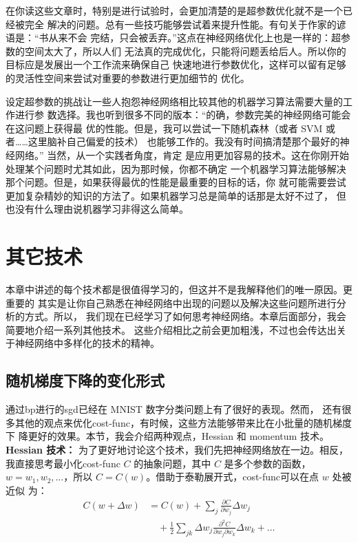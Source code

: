 在你读这些文章时，特别是进行试验时，会更加清楚的是超参数优化就不是一个已经被完全
解决的问题。总有一些技巧能够尝试着来提升性能。有句关于作家的谚语是：“书从来不会
完结，只会被丢弃。”这点在神经网络优化上也是一样的：超参数的空间太大了，所以人们
无法真的完成优化，只能将问题丢给后人。所以你的目标应是发展出一个工作流来确保自己
快速地进行参数优化，这样可以留有足够的灵活性空间来尝试对重要的参数进行更加细节的
优化。

设定超参数的挑战让一些人抱怨神经网络相比较其他的机器学习算法需要大量的工作进行参
数选择。我也听到很多不同的版本：“的确，参数完美的神经网络可能会在这问题上获得最
优的性能。但是，我可以尝试一下随机森林（或者 SVM 或者……这里脑补自己偏爱的技术）
也能够工作的。我没有时间搞清楚那个最好的神经网络。” 当然，从一个实践者角度，肯定
是应用更加容易的技术。这在你刚开始处理某个问题时尤其如此，因为那时候，你都不确定
一个机器学习算法能够解决那个问题。但是，如果获得最优的性能是最重要的目标的话，你
就可能需要尝试更加复杂精妙的知识的方法了。如果机器学习总是简单的话那是太好不过了，
但也没有什么理由说机器学习非得这么简单。

\section{其它技术}
\label{sec:other_techniques}
\label{sec:other_techniques_for_regularization}

本章中讲述的每个技术都是很值得学习的，但这并不是我解释他们的唯一原因。更重要的
其实是让你自己熟悉在神经网络中出现的问题以及解决这些问题所进行分析的方式。所以，
我们现在已经学习了如何思考神经网络。本章后面部分，我会简要地介绍一系列其他技术。
这些介绍相比之前会更加粗浅，不过也会传达出关于神经网络中多样化的技术的精神。

\subsection{随机梯度下降的变化形式}

通过\gls*{bp}进行的\gls*{sgd}已经在 MNIST 数字分类问题上有了很好的表现。然而，
还有很多其他的观点来优化\gls*{cost-func}，有时候，这些方法能够带来比在小批量的随机梯度下
降更好的效果。本节，我会介绍两种观点，Hessian 和 momentum 技术。\\

\textbf{Hessian 技术：} 为了更好地讨论这个技术，我们先把神经网络放在一边。相反，
我直接思考最小化\gls*{cost-func} $C$ 的抽象问题，其中 $C$ 是多个参数的函数，
$w=w_1,w_2,\ldots$，所以 $C=C(w)$。借助于泰勒展开式，\gls*{cost-func}可以在点 $w$ 处被近似
为：
\begin{align}
  C(w+\Delta w) &= C(w) + \sum_j \frac{\partial C}{\partial w_j} \Delta w_j \nonumber \\
     & \quad + \frac{1}{2} \sum_{jk} \Delta w_j \frac{\partial^2 C}{\partial w_j \partial w_k} \Delta w_k + \ldots \label{eq:103}\tag{103}
\end{align}

